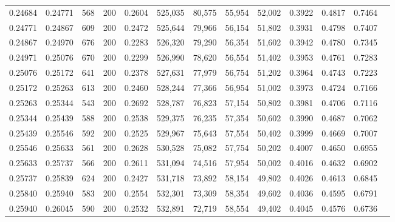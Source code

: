 \begin{tabular}{rrrrrrrrrrrrr}
0.24684 & 0.24771 &    568 & 200 &                                     0.2604 & 525,035 &  80,575 &  55,954 &  52,002 & 0.3922 & 0.4817 & 0.7464 \\
0.24771 & 0.24867 &    609 & 200 &                                     0.2472 & 525,644 &  79,966 &  56,154 &  51,802 & 0.3931 & 0.4798 & 0.7407 \\
0.24867 & 0.24970 &    676 & 200 &                                     0.2283 & 526,320 &  79,290 &  56,354 &  51,602 & 0.3942 & 0.4780 & 0.7345 \\
0.24971 & 0.25076 &    670 & 200 &                                     0.2299 & 526,990 &  78,620 &  56,554 &  51,402 & 0.3953 & 0.4761 & 0.7283 \\
0.25076 & 0.25172 &    641 & 200 &                                     0.2378 & 527,631 &  77,979 &  56,754 &  51,202 & 0.3964 & 0.4743 & 0.7223 \\
0.25172 & 0.25263 &    613 & 200 &                                     0.2460 & 528,244 &  77,366 &  56,954 &  51,002 & 0.3973 & 0.4724 & 0.7166 \\
0.25263 & 0.25344 &    543 & 200 &                                     0.2692 & 528,787 &  76,823 &  57,154 &  50,802 & 0.3981 & 0.4706 & 0.7116 \\
0.25344 & 0.25439 &    588 & 200 &                                     0.2538 & 529,375 &  76,235 &  57,354 &  50,602 & 0.3990 & 0.4687 & 0.7062 \\
0.25439 & 0.25546 &    592 & 200 &                                     0.2525 & 529,967 &  75,643 &  57,554 &  50,402 & 0.3999 & 0.4669 & 0.7007 \\
0.25546 & 0.25633 &    561 & 200 &                                     0.2628 & 530,528 &  75,082 &  57,754 &  50,202 & 0.4007 & 0.4650 & 0.6955 \\
0.25633 & 0.25737 &    566 & 200 &                                     0.2611 & 531,094 &  74,516 &  57,954 &  50,002 & 0.4016 & 0.4632 & 0.6902 \\
0.25737 & 0.25839 &    624 & 200 &                                     0.2427 & 531,718 &  73,892 &  58,154 &  49,802 & 0.4026 & 0.4613 & 0.6845 \\
0.25840 & 0.25940 &    583 & 200 &                                     0.2554 & 532,301 &  73,309 &  58,354 &  49,602 & 0.4036 & 0.4595 & 0.6791 \\
0.25940 & 0.26045 &    590 & 200 &                                     0.2532 & 532,891 &  72,719 &  58,554 &  49,402 & 0.4045 & 0.4576 & 0.6736 \\

\end{tabular}
